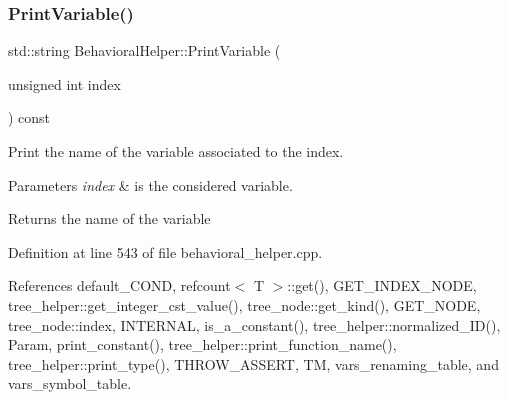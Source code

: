 \subsubsection{\texorpdfstring{Print\+Variable()}{PrintVariable()}}
{\footnotesize\ttfamily std\+::string Behavioral\+Helper\+::\+Print\+Variable (\begin{DoxyParamCaption}\item[{unsigned int}]{index }\end{DoxyParamCaption}) const}



Print the name of the variable associated to the index. 


\begin{DoxyParams}{Parameters}
{\em index} & is the considered variable. \\
\hline
\end{DoxyParams}
\begin{DoxyReturn}{Returns}
the name of the variable 
\end{DoxyReturn}


Definition at line 543 of file behavioral\+\_\+helper.\+cpp.



References default\+\_\+\+C\+O\+ND, refcount$<$ T $>$\+::get(), G\+E\+T\+\_\+\+I\+N\+D\+E\+X\+\_\+\+N\+O\+DE, tree\+\_\+helper\+::get\+\_\+integer\+\_\+cst\+\_\+value(), tree\+\_\+node\+::get\+\_\+kind(), G\+E\+T\+\_\+\+N\+O\+DE, tree\+\_\+node\+::index, I\+N\+T\+E\+R\+N\+AL, is\+\_\+a\+\_\+constant(), tree\+\_\+helper\+::normalized\+\_\+\+I\+D(), Param, print\+\_\+constant(), tree\+\_\+helper\+::print\+\_\+function\+\_\+name(), tree\+\_\+helper\+::print\+\_\+type(), T\+H\+R\+O\+W\+\_\+\+A\+S\+S\+E\+RT, TM, vars\+\_\+renaming\+\_\+table, and vars\+\_\+symbol\+\_\+table.



